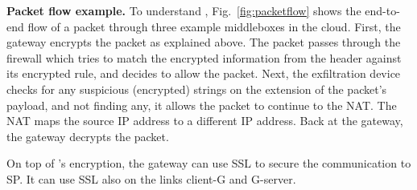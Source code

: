 


\smallskip
\noindent\textbf{Packet flow example.}
To understand \sys, Fig.~\ref{fig:packetflow} shows the end-to-end flow of a packet through three example middleboxes in the cloud.  First,  the gateway encrypts the packet as explained above. The packet passes through the firewall which tries to match the encrypted information from the header against its encrypted rule, and decides to allow the packet. Next, the exfiltration device checks for any suspicious (encrypted) strings on the extension of the packet's payload, and not finding any, it allows the packet  to continue to the NAT. The NAT maps the source IP address to a different IP address. Back at the gateway, the gateway decrypts the packet. 

On top of \sys's encryption, the gateway can use SSL  to secure the communication to SP.  It can use SSL also on the links client-G and G-server.


